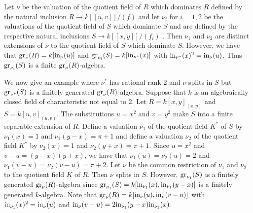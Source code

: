 \documentclass[11pt]{amsart}
\begin{document}
  Let $\nu$ be the valuation of the quotient field of $R$ which dominates $R$ defined by the natural inclusion $R\rightarrow k[[u,v]]/(f)$ and let $\nu_i$ for $i=1,2$  be the valuations of the quotient field of $S$ which dominate $S$ and are defined by the respective natural inclusions $S\rightarrow k[[x,y]]/(f_i)$ . Then $\nu_1$ and $\nu_2$ are distinct extensions of $\nu$ to the quotient field of $S$ which dominate $S$. However,
  we have that 
  $ {\rm gr}_{\nu}(R)=k[{\rm in}_{\nu}(u)]$ and ${\rm gr}_{\nu_i}(S)=k[{\rm in}_{\nu^*}(x)]$ with ${\rm in}_{\nu^*}(x)^2={\rm in}_{\nu}(u)$. Thus ${\rm gr}_{\nu_i}(S)$ is a finite  $ {\rm gr}_{\nu}(R)$-algebra. 
  
  
 We now give an example where $\nu^*$ has rational rank 2 and  $\nu$  splits in $S$ but ${\rm gr}_{\nu^*}(S)$ is a finitely generated ${\rm gr}_{\nu}(R)$-algebra. Suppose that $k$ is an algebraically closed field of characteristic not equal to 2.
  Let $R=k[x,y]_{(x,y)}$ and $S=k[u,v]_{(u,v)}$.  The substitutions $u=x^2$ and $v=y^2$ make $S$ into a finite separable extension of $R$. 
  Define a valuation $\nu_1$ of the quotient field $K^*$ of $S$ by $\nu_1(x)=1$ and $\nu_1(y-x)=\pi+1$ and define a valuation $\nu_2$ of the quotient field $K^*$ by $\nu_2(x)=1$ and $\nu_2(y+x)=\pi+1$.
Since $u=x^2$ and $v-u=(y-x)(y+x)$, we have that $\nu_1(u)=\nu_2(u)=2$ and $\nu_1(v-u)=\nu_2(v-u)=\pi+2$. Let $\nu$ be the common restriction of $\nu_1$ and $\nu_2$ to the quotient field $K$ of $R$.
Then $\nu$ splits in $S$. However, ${\rm gr}_{\nu_1}(S)$ is a finitely generated ${\rm gr}_{\nu}(R)$-algebra since 
${\rm gr}_{\nu_1}(S)=k[{\rm in}_{\nu_1}(x),{\rm in }_{\nu_1}(y-x)]$ is a finitely generated $k$-algebra.  Note that  ${\rm gr}_{\nu}(R)=k[{\rm in}_{\nu}(u),{\rm in }_{\nu}(v-u)]$ with 
${\rm in}_{\nu_1}(x)^2={\rm in}_{\nu}(u)$ and ${\rm in}_{\nu}(v-u)=2{\rm in}_{\nu_1}(y-x){\rm in}_{\nu_1}(x)$.
\end{document}
